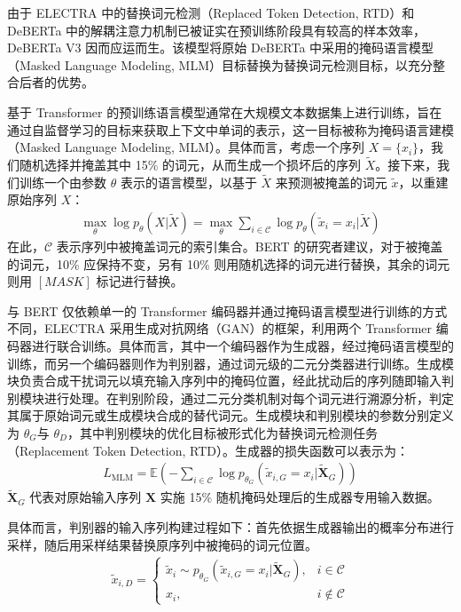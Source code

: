 由于 ELECTRA \cite{clark2020electrapretrainingtextencoders} 中的替换词元检测（Replaced Token Detection, RTD）和 DeBERTa 中的解耦注意力机制已被证实在预训练阶段具有较高的样本效率，DeBERTa V3 因而应运而生。该模型将原始 DeBERTa 中采用的掩码语言模型（Masked Language Modeling, MLM）目标替换为替换词元检测目标，以充分整合后者的优势。

基于 Transformer 的预训练语言模型通常在大规模文本数据集上进行训练，旨在通过自监督学习的目标来获取上下文中单词的表示，这一目标被称为掩码语言建模（Masked Language Modeling, MLM）\cite{devlin_bert_2019}。具体而言，考虑一个序列 \(X = \{x_i\}\)，我们随机选择并掩盖其中 15\% 的词元，从而生成一个损坏后的序列 \(\tilde{X}\)。接下来，我们训练一个由参数 \(\theta\) 表示的语言模型，以基于 \(\tilde{X}\) 来预测被掩盖的词元 \(\tilde{x}\)，以重建原始序列 \(X\)：
\begin{align}
\max_{\theta} \log p_{\theta}(X|\tilde{X}) = \max_{\theta} \sum_{i \in \mathcal{C}} \log p_{\theta}(\tilde{x}_i = x_i|\tilde{X})
\end{align}
在此，\(\mathcal{C}\) 表示序列中被掩盖词元的索引集合。BERT 的研究者建议，对于被掩盖的词元，10\% 应保持不变，另有 10\% 则用随机选择的词元进行替换，其余的词元则用 \([MASK]\) 标记进行替换。

与 BERT 仅依赖单一的 Transformer 编码器并通过掩码语言模型进行训练的方式不同，ELECTRA 采用生成对抗网络（GAN）的框架，利用两个 Transformer 编码器进行联合训练。具体而言，其中一个编码器作为生成器，经过掩码语言模型的训练，而另一个编码器则作为判别器，通过词元级的二元分类器进行训练。生成模块负责合成干扰词元以填充输入序列中的掩码位置，经此扰动后的序列随即输入判别模块进行处理。在判别阶段，通过二元分类机制对每个词元进行溯源分析，判定其属于原始词元或生成模块合成的替代词元。生成模块和判别模块的参数分别定义为 \(\theta_G\)​ 与 \(\theta_D\)​，其中判别模块的优化目标被形式化为替换词元检测任务（Replacement Token Detection, RTD）。生成器的损失函数可以表示为：
\begin{align} 
L_{\text{MLM}} = \mathbb{E} \left( - \sum_{i \in \mathcal{C}} \log p_{\theta_G}(\tilde{x}_{i,G} = x_i|\tilde{\mathbf{X}}_G) \right)
\end{align}
\(\tilde{\mathbf{X}}_G\) 代表对原始输入序列 \(\mathbf{X}\) 实施 15\% 随机掩码处理后的生成器专用输入数据。

具体而言，判别器的输入序列构建过程如下：首先依据生成器输出的概率分布进行采样，随后用采样结果替换原序列中被掩码的词元位置。
\begin{align} 
\tilde{x}_{i,D} = \begin{cases} \tilde{x}_{i} \sim p_{\theta_G}(\tilde{x}_{i,G} = x_i|\tilde{\mathbf{X}}_G), & i \in \mathcal{C} \\ x_i, & i \notin \mathcal{C} \end{cases}
\end{align}

